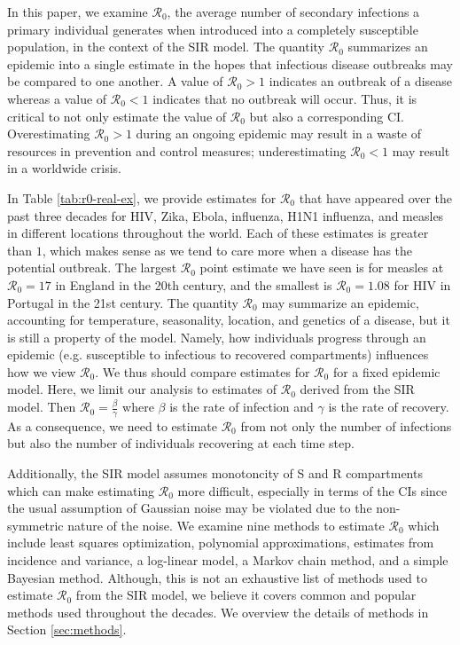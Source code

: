 \documentclass[12pt]{article}
\newcommand{\wxxsir}{nine } %
\newcommand{\rr}{\ensuremath{\mathcal{R}_0}}
\begin{document}


In this paper, we examine $\rr$, the average number of secondary infections a primary individual generates when introduced into a completely susceptible population, in the context of the SIR model.  The quantity $\rr$ summarizes an epidemic into a single estimate in the hopes that infectious disease outbreaks may be compared to one another.  A value of $\rr > 1$ indicates an outbreak of a disease whereas a value of $\rr < 1$ indicates that no outbreak will occur.  Thus, it is critical to not only estimate the value of $\rr$ but also a corresponding CI.  Overestimating $\rr > 1$ during an ongoing epidemic may result in a waste of resources in prevention and control measures; underestimating $\rr < 1$ may result in a worldwide crisis.

In Table \ref{tab:r0-real-ex}, we provide estimates for $\rr$ that have appeared over the past three decades for HIV, Zika, Ebola, influenza, H1N1 influenza, and measles in different locations throughout the world.  Each of these estimates is greater than $1$, which makes sense as we tend to care more when a disease has the potential outbreak.  The largest $\rr$ point estimate we have seen is for measles at $\rr=17$ in England in the 20th century, and the smallest is $\rr=1.08$ for HIV in Portugal in the 21st century.
The quantity $\rr$ may summarize an epidemic, accounting for temperature, seasonality, location, and genetics of a disease, but it is still a property of the model.  Namely, how individuals progress through an epidemic (e.g. susceptible to infectious to recovered compartments) influences how we view $\rr$.  We thus should compare estimates for $\rr$ for a fixed epidemic model.  Here, we limit our analysis to estimates of $\rr$ derived from the SIR model.  Then $\rr = \frac{\beta}{\gamma}$ where $\beta$ is the rate of infection and $\gamma$ is the rate of recovery.  As a consequence, we need to estimate $\rr$ from not only the number of infections but also the number of individuals recovering at each time step.


Additionally, the SIR model assumes monotoncity of S and R compartments which can make estimating $\rr$ more difficult, especially in terms of the CIs since the usual assumption of Gaussian noise may be violated due to the non-symmetric nature of the noise.  We examine \wxxsir methods to estimate $\rr$ which include least squares optimization, polynomial approximations, estimates from incidence and variance, a log-linear model, a Markov chain method, and a simple Bayesian method.  Although, this is not an exhaustive list of methods used to estimate $\rr$ from the SIR model, we believe it covers common and popular methods used throughout the decades.  We overview the details of methods in Section \ref{sec:methods}.
\end{document}
